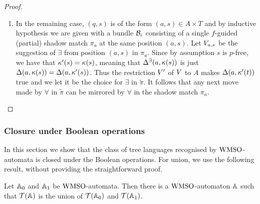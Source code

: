 \begin{proof}
\begin{enumerate}[label = (\Alph*), ref = \Alph*]
\begin{enumerate}[label = (\roman*), ref = \roman*]
  \end{enumerate}
  \item In the remaining case, $(q,s)$ is of the form $(a,s) \in A \times T$ and by inductive hypothesis we are given with a bundle $\mathcal{B}_i$ consisting of a single $f$-guided (partial) shadow match $\pi_a$ at the same position $(a,s)$. Let $V_{a,s}$ be the suggestion of $\exists$ from position $(a,s)$ in $\pi_a$. Since by assumption $s$ is $p$-free, we have that $\kappa'(s) = \kappa(s)$, meaning that $\Delta^\exists(a,\kappa(s))$ is just $\Delta(a,\kappa(s)) = \Delta(a,\kappa'(s))$. Thus the restriction $V'$ of $V$ to $A$ makes $\Delta(a,\kappa'(t))$ true and we let it be the choice for $\exists$ in $\tilde{\pi}$. It follows that any next move made by $\forall$ in $\tilde{\pi}$ can be mirrored by $\forall$ in the shadow match $\pi_a$.
      \begin{comment}Version with minimality:
      It follows that $\tmapProj(a,\tscolors(t))$ is just $\tmap(a,\tscolors(t)) = \tmap(a,\tscolors'(t))$ and the same valuation suggested by $f$ in $\pi_a$ is a legitimate choice for $\exists$ in $\tilde{\pi}$. By letting $\exists$ choose such valuation, it follows that any next move made by $\forall$ in $\tilde{\pi}$ can be mirrored by $\forall$ in the shadow match $\pi_a$.
      \end{comment}
\end{enumerate}
\end{proof} 


\subsubsection{Closure under Boolean operations}

In this section we show that the class of tree languages recognised by $\mathrm{WMSO}$-automata is closed under the Boolean operations.
%
For union, we use the following result, without
providing the straightforward proof.

\begin{lemma}
\label{t:cl-dis}
Let $\mathbb{A}_{0}$ and $\mathbb{A}_{1}$ be $\mathrm{WMSO}$-automata. 
Then there is a $\mathrm{WMSO}$-automaton $\mathbb{A}$ such that $\mathcal{T}(\mathbb{A})$ is the 
union of $\mathcal{T}(\mathbb{A}_{0})$ and $\mathcal{T}(\mathbb{A}_{1})$.
\end{lemma}

